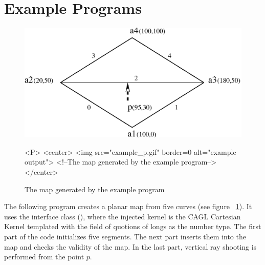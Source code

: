 
\section{Example Programs}
\label{PM_sec:example}

\begin{figure}[h]
\begin{ccTexOnly}
    \centerline{
      \includegraphics{example_p.ps}
    }
\end{ccTexOnly}

\caption{The map generated by the example program
\label{PM_sec:example_pic}}

\begin{ccHtmlOnly}
    <P>
    <center>
        <img src="example_p.gif"  border=0 alt="example output">
        <!--The map generated by the example program-->
    </center>
\end{ccHtmlOnly}
\end{figure}

The following program creates a planar map from five curves (see figure
~\ref{PM_sec:example_pic}). It uses the interface class
(), where the injected kernel is the
CAGL Cartesian Kernel templated with the field of quotions of longs as the
number type.
The first part of the code initializes five segments. The next part inserts them
into the map and checks the validity of the map. In the last part, vertical ray
shooting is performed from the point $p$.



